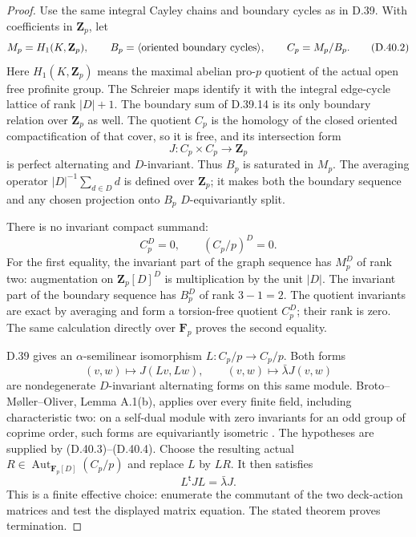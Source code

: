 \begin{proof}
Use the same integral Cayley chains and boundary
cycles as in D.39.  With coefficients in
\(\mathbf Z_p\), let
\[
 M_p=H_1(K,\mathbf Z_p),\qquad
 B_p=\langle\hbox{oriented boundary cycles}\rangle,\qquad
 C_p=M_p/B_p.
 \tag{D.40.2}
\]
Here \(H_1(K,\mathbf Z_p)\) means the maximal
abelian pro-\(p\) quotient of the actual open
free profinite group.
The Schreier maps identify it with the integral
edge-cycle lattice of rank \(|D|+1\).
The boundary sum of D.39.14 is its only boundary
relation over \(\mathbf Z_p\) as well.
The quotient \(C_p\) is the homology of the
closed oriented compactification of that cover,
so it is free, and its intersection form
\[
                    J:C_p\times C_p\longrightarrow\mathbf Z_p
 \tag{D.40.3}
\]
is perfect alternating and \(D\)-invariant.
Thus \(B_p\) is saturated in \(M_p\).
The averaging operator \(|D|^{-1}\sum_{d\in D}d\)
is defined over \(\mathbf Z_p\); it makes both
the boundary sequence and any chosen projection
onto \(B_p\) \(D\)-equivariantly split.

There is no invariant compact summand:
\[
                         C_p^D=0,\qquad
                         (C_p/p)^D=0.
 \tag{D.40.4}
\]
For the first equality, the invariant part of
the graph sequence has \(M_p^D\) of rank two:
augmentation on \(\mathbf Z_p[D]^D\) is multiplication
by the unit \(|D|\).
The invariant part of the boundary sequence
has \(B_p^D\) of rank \(3-1=2\).
The quotient invariants are exact by averaging
and form a torsion-free quotient \(C_p^D\);
their rank is zero.
The same calculation directly over \(\mathbf F_p\)
proves the second equality.

D.39 gives an \(\alpha\)-semilinear isomorphism
\(L:C_p/p\to C_p/p\).
Both forms
\[
              (v,w)\longmapsto J(Lv,Lw),\qquad
              (v,w)\longmapsto\bar\lambda J(v,w)
 \tag{D.40.5}
\]
are nondegenerate \(D\)-invariant alternating
forms on this same module.
Broto--M\o ller--Oliver, Lemma A.1(b),
applies over every finite field, including
characteristic two: on a self-dual module with
zero invariants for an odd group of coprime
order, such forms are equivariantly isometric
\cite{ACoprimeBMO2012}.
The hypotheses are supplied by
\textup{(D.40.3)--(D.40.4)}.
Choose the resulting actual
\(R\in\operatorname{Aut}_{\mathbf F_p[D]}(C_p/p)\)
and replace \(L\) by \(LR\).  It then satisfies
\[
                    L^{\mathsf t}JL=\bar\lambda J.
 \tag{D.40.6}
\]
This is a finite effective choice: enumerate
the commutant of the two deck-action matrices
and test the displayed matrix equation.
The stated theorem proves termination.


\end{proof}
